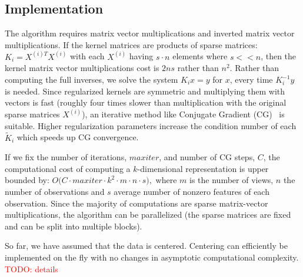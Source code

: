\subsection{Implementation}\label{subsec:implementation}
The algorithm requires matrix vector multiplications and inverted
matrix vector multiplications. If the kernel matrices are products of
sparse matrices: $K_i = X^{(i)T} X^{(i)}$ with each $X^{(i)}$ having
$s\cdot n$ elements
where $s << n$, then the kernel matrix vector multiplications cost is $2 n s$
rather than $n^2$. Rather than computing the full inverses, we solve
the system $K_i x = y$ for $x$, every time $K_i^{-1} y$ is needed. Since
regularized kernels are symmetric and multiplying them with vectors is
fast (roughly four times slower than multiplication with the original 
sparse matrices $X^{(i)}$), an iterative method like Conjugate Gradient (CG)~\cite{golub} is
suitable. Higher regularization parameters increase the condition
number of each $\tilde{K}_i$ which speeds up CG convergence.
\par
If we fix the number of iterations, $maxiter$, and number
of CG steps, $C$, the computational cost of computing a
$k$-dimensional representation is upper bounded by: $O\big(C \cdot
maxiter \cdot k^2 \cdot m \cdot n \cdot s \big),$ where $m$ is the
number of views, $n$ the number of observations and $s$ average number
of nonzero features of each observation.
Since the majority of computations are  sparse matrix-vector multiplications, the
algorithm can be parallelized (the sparse matrices are fixed and can be split into multiple
blocks).

So far, we have assumed that the data is centered. Centering can efficiently be implemented on the
fly with no changes in asymptotic computational complexity. \textcolor{red}{TODO: details}